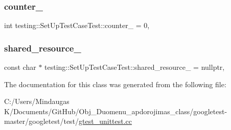\subsubsection{\texorpdfstring{counter\_}{counter\_}}
{\footnotesize\ttfamily int testing\+::\+Set\+Up\+Test\+Case\+Test\+::counter\+\_\+ = 0\hspace{0.3cm}{\ttfamily [static]}, {\ttfamily [protected]}}

\mbox{\label{classtesting_1_1_set_up_test_case_test_a904e77fd9a628b6a9aca0280665fd040}} 
\subsubsection{\texorpdfstring{shared\_resource\_}{shared\_resource\_}}
{\footnotesize\ttfamily const char $\ast$ testing\+::\+Set\+Up\+Test\+Case\+Test\+::shared\+\_\+resource\+\_\+ = nullptr\hspace{0.3cm}{\ttfamily [static]}, {\ttfamily [protected]}}



The documentation for this class was generated from the following file\+:\begin{DoxyCompactItemize}
\item 
C\+:/\+Users/\+Mindaugas K/\+Documents/\+Git\+Hub/\+Obj\+\_\+\+Duomenu\+\_\+apdorojimas\+\_\+class/googletest-\/master/googletest/test/\mbox{\hyperlink{googletest-master_2googletest_2test_2gtest__unittest_8cc}{gtest\+\_\+unittest.\+cc}}\end{DoxyCompactItemize}
